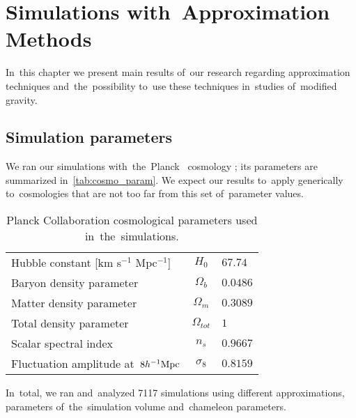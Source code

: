 \chapter{Simulations with~Approximation Methods}
\label{chpt:app_sims}
In~this chapter we present main results of~our research regarding approximation techniques and~the~possibility to~use these techniques in~studies of~modified gravity.%

\section{Simulation parameters}
We ran our simulations with~the~Planck \LCDM\ cosmology \parencite{planck_cosm}; its parameters are summarized in~\autoref{tab:cosmo_param}. We expect our results to~apply generically to~cosmologies that are not too far from this set of~parameter values.
\begin{table}[!b]
\centering
\begin{tabular}{ l c l }
  \hline \hline
  Hubble constant  [km s$^{-1}$ Mpc$^{-1}$] & $H_0$ & $67.74$ \\
  Baryon density parameter & $\Omega_b$ & $0.0486$ \\
  Matter density parameter & $\Omega_m$ & $0.3089$ \\
  Total density parameter & $\Omega_{tot}$ & $1$ \\
  Scalar spectral index & $n_s$ & $0.9667$ \\
  Fluctuation amplitude at~$8h^{-1}\text{Mpc}$ & $\sigma_8$ & $0.8159$ \\
  \hline \hline
\end{tabular}
\caption{Planck Collaboration cosmological parameters \parencite{planck_cosm} used in~the~simulations.}
\label{tab:cosmo_param}
\end{table}
In~total, we ran and~analyzed 7117 simulations using different approximations, parameters of~the~simulation volume and~chameleon parameters.%

